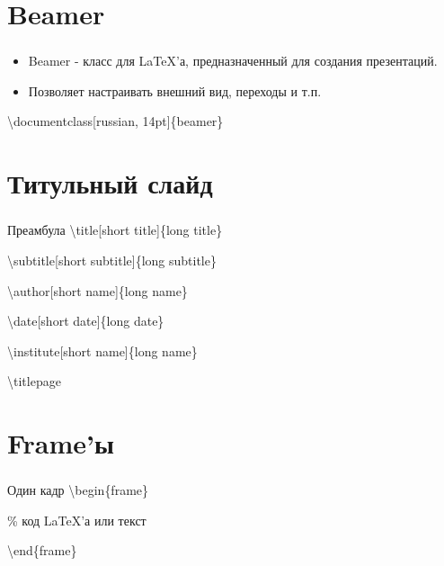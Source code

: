 \documentclass[russian, 14pt]{beamer}
\newcommand{\cm}[1]{{\color{Mycolor3}\textbackslash#1}}
\begin{document}
\section{Beamer}

\begin{frame}
	\frametitle{\insertsection}
	\begin{itemize}
		\item[\textbullet] Beamer - класс для \LaTeX'а, предназначенный для создания презентаций.
		\item[\textbullet] Позволяет настраивать внешний вид, переходы и т.п.
	\end{itemize}
	\begin{block}{}
		 \cm{documentclass}[russian, 14pt]\{beamer\}
	\end{block}
\end{frame}

\section{Титульный слайд}

\begin{frame}
	\frametitle{\insertsection}
	\begin{block}{Преамбула}
		\cm{title}[short title]\{long title\}
		
		
		\cm{subtitle}[short subtitle]\{long subtitle\}
		
		
		\cm{author}[short name]\{long name\}
		
		
		\cm{date}[short date]\{long date\}
		
		
		\cm{institute}[short name]\{long name\}
		
		
		\cm{titlepage}
	\end{block}
\end{frame}

\section{Frame'ы}

\begin{frame}
	\frametitle{\insertsection}
	\begin{block}{Один кадр}
		\cm{begin}\{frame\}
		
		
		\% код \LaTeX'а или текст 
		
		
		\cm{end}\{frame\}
	\end{block}
\end{frame}
\end{document}
